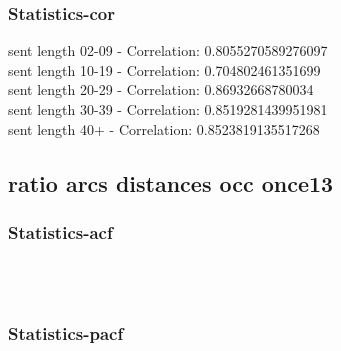 \documentclass{article}%
\begin{document}
%
\newpage%
\subsubsection{Statistics{-}cor}%
\label{ssubsec:Statistics{-}cor}%
\noindent%
sent length 02-09 - Correlation: 0.8055270589276097\\%
sent length 10-19 - Correlation: 0.704802461351699\\%
sent length 20-29 - Correlation: 0.86932668780034\\%
sent length 30-39 - Correlation: 0.8519281439951981\\%
sent length 40+ - Correlation: 0.8523819135517268\\

%
\newpage

%
\subsection{ratio arcs distances occ once13}%
\label{subsec:ratioarcsdistancesocconce13}%
\subsubsection{Statistics{-}acf}%
\label{ssubsec:Statistics{-}acf}%


\begin{figure}[ht]%
\centering%
\setlength{\abovecaptionskip}{-35pt}%
%
%
\\%
%
%
\\%
%
\end{figure}

%
\newpage%
\subsubsection{Statistics{-}pacf}%
\label{ssubsec:Statistics{-}pacf}%
\end{document}

